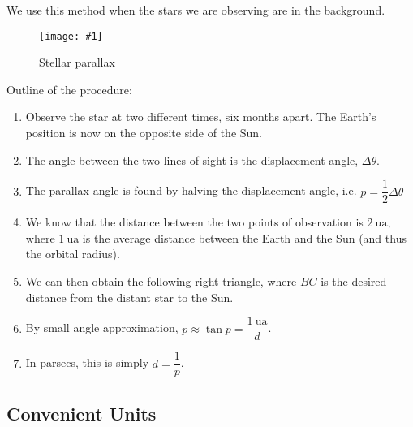 \documentclass[a4paper,12pt]{article}
\newcommand{\img}[4]{\begin{center}
  \begin{figure}[H]
    \centering
    \texttt{[image: \#1]}
    \caption{#3}
    \label{fig:#4}
  \end{figure}
\end{center}}
\begin{document}
We use this method when the stars we are observing are  in the background.

\img{stellarparallax.png}{1}{Stellar parallax}{stellarparallax}

\pagebreak

Outline of the procedure:
\begin{enumerate}
  \item Observe the star at two different times, six months apart. The Earth's position is now on the opposite side of the Sun.
  \item The angle between the two lines of sight is the displacement angle, $\Delta \theta$.
  \item The parallax angle is found by halving the displacement angle, i.e. $p = \dfrac{1}{2}\Delta \theta$
  \item We know that the distance between the two points of observation is $\SI{2}{\astronomicalunit}$, where $\SI{1}{\astronomicalunit}$ is the average distance between the Earth and the Sun (and thus the orbital radius).
  \item We can then obtain the following right-triangle, where $BC$ is the desired distance from the distant star to the Sun.
        \begin{figure}[H]
          \centering
        \end{figure}
  \item By small angle approximation, $p \approx \tan p = \dfrac{\SI{1}{\astronomicalunit}}{d}$.
  \item In parsecs, this is simply $d = \dfrac{1}{p}$.
\end{enumerate}

\subsection{Convenient Units}
\end{document}
